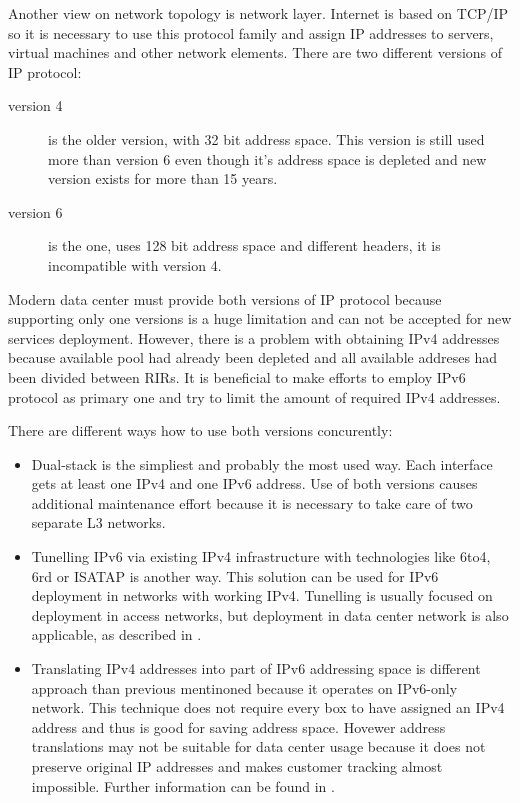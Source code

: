 Another view on network topology is network layer. Internet is based on \Ac{TCP}/\Ac{IP} so it is necessary to use this protocol family and assign \Ac{IP} addresses to servers, virtual machines and other network elements. There are two different versions of \Ac{IP} protocol:
\begin{description}
	\item[version 4] is the older version, with 32 bit address space. This version is still used more than version 6 even though it's address space is depleted and new version exists for more than 15 years.
	\item[version 6] is the  one, uses 128 bit address space and different headers, it is incompatible with version 4.
\end{description}

Modern data center must provide both versions of \Ac{IP} protocol because supporting only one versions is a huge limitation and can not be accepted for new services deployment. 
However, there is a problem with obtaining \Ac{IPv4} addresses because available pool had already been depleted and all available addreses had been divided between \Ac{RIR}s. It is beneficial to make efforts to employ \Ac{IPv6} protocol as primary one and try to limit the amount of required \Ac{IPv4} addresses.


There are different ways how to use both versions concurently:
\begin{itemize}
	\item Dual-stack is the simpliest and probably the most used way. Each interface gets at least one \Ac{IPv4} and one \Ac{IPv6} address. Use of both versions causes additional maintenance effort because it is necessary to take care of two separate L3 networks.
	\item Tunelling \Ac{IPv6} via existing \Ac{IPv4} infrastructure with technologies like 6to4, 6rd or \Ac{ISATAP} is another way. This solution can be used for \Ac{IPv6} deployment in networks with working \Ac{IPv4}. 
	Tunelling is usually focused on deployment in access networks, but deployment in data center network is also applicable, as described in \cite{draft-sakura-6rd}.
	\item Translating \Ac{IPv4} addresses into part of \Ac{IPv6} addressing space is different approach than previous mentinoned because it operates on \Ac{IPv6}-only network. This technique does not require every box to have assigned an \Ac{IPv4} address and thus is good for saving address space. Hovewer address translations may not be suitable for data center usage because it does not preserve original \Ac{IP} addresses and makes customer tracking almost impossible. Further information can be found in \cite{ipv4-jako-sluzba}.
\end{itemize}

